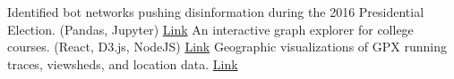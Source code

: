 	\begin{projects}
			{Identified bot networks pushing disinformation during the 2016 Presidential Election. (Pandas, Jupyter)}
			{\href{https://github.com/ryan-p-larson/polititweets}{Link}}
			{An interactive graph explorer for college courses. (React, D3.js, NodeJS)}
			{\href{https://github.com/ryan-p-larson/higher-knowledge-graph}{Link}}
			{Geographic visualizations of GPX running traces, viewsheds, and location data.}
			{\href{https://github.com/ryan-p-larson/city-maps}{Link}}
	\end{projects}